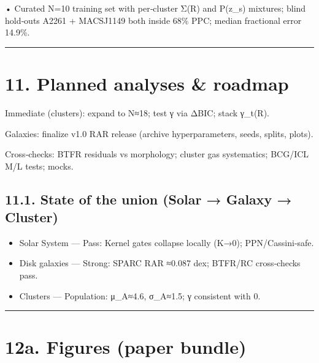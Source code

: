 \documentclass[11pt,a4paper]{article}
\begin{document}
• Curated N=10 training set with per‑cluster Σ(R) and P(z\_s) mixtures; blind hold‑outs A2261 + MACSJ1149 both inside 68\% PPC; median fractional error 14.9\%.


\medskip\hrule\medskip


\section{11. Planned analyses \& roadmap}


Immediate (clusters): expand to N≈18; test γ via ΔBIC; stack γ\_t(R).


Galaxies: finalize v1.0 RAR release (archive hyperparameters, seeds, splits, plots).


Cross‑checks: BTFR residuals vs morphology; cluster gas systematics; BCG/ICL M/L tests; mocks.


\subsection{11.1. State of the union (Solar → Galaxy → Cluster)}


\begin{itemize}
\item Solar System — Pass: Kernel gates collapse locally (K→0); PPN/Cassini‑safe.
\item Disk galaxies — Strong: SPARC RAR ≈0.087 dex; BTFR/RC cross‑checks pass.
\item Clusters — Population: μ\_A≈4.6, σ\_A≈1.5; γ consistent with 0.
\end{itemize}


\medskip\hrule\medskip


\section{12a. Figures (paper bundle)}
\end{document}
